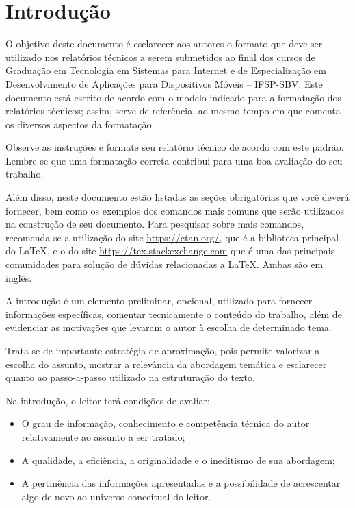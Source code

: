 \chapter{Introdução}
\label{cap:01}

O objetivo deste documento é esclarecer aos autores o formato que deve ser utilizado nos relatórios técnicos a serem submetidos ao final dos cursos de Graduação em Tecnologia em Sistemas para Internet e de Especialização em Desenvolvimento de Aplicações para Dispositivos Móveis – IFSP-SBV. Este documento está escrito de acordo com o modelo indicado para a formatação dos relatórios técnicos; assim, serve de referência, ao mesmo tempo em que comenta os diversos aspectos da formatação.

Observe as instruções e formate seu relatório técnico de acordo com este padrão. Lembre-se que uma formatação correta contribui para uma boa avaliação do seu trabalho.

Além disso, neste documento estão listadas as seções obrigatórias que você deverá fornecer, bem como os exemplos dos comandos mais comuns que serão utilizados na construção de seu documento. Para pesquisar sobre mais comandos, recomenda-se a utilização do site \url{https://ctan.org/}, que é a biblioteca principal do \LaTeX, e o do site \url{https://tex.stackexchange.com} que é uma das principais comunidades para solução de dúvidas relacionadas a \LaTeX. Ambas são em inglês.

A introdução é um elemento preliminar, opcional, utilizado para fornecer informações específicas, comentar tecnicamente o conteúdo do trabalho, além de evidenciar as motivações que levaram o autor à escolha de determinado tema.

Trata-se de importante estratégia de aproximação, pois permite valorizar a escolha do assunto, mostrar a relevância da abordagem temática e esclarecer quanto ao passo-a-passo utilizado na estruturação do texto.

Na introdução, o leitor terá condições de avaliar:

\begin{itemize}
	\item O grau de informação, conhecimento e competência técnica do autor relativamente ao assunto a ser tratado;
	\item A qualidade, a eficiência, a originalidade e o ineditismo de sua abordagem;
	\item A pertinência das informações apresentadas e a possibilidade de acrescentar algo de novo ao universo conceitual do leitor.
\end{itemize}


